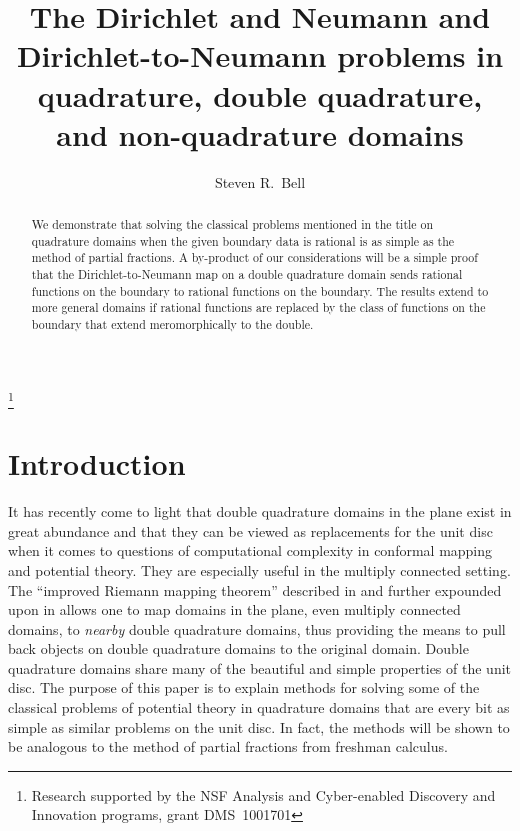 \documentclass[12pt]{amsart}
\numberwithin{equation}{section}
\begin{document}
\title[Dirichlet and Neumann
problems in quadrature domains]
{The Dirichlet and Neumann and Dirichlet-to-Neumann
problems in quadrature, double quadrature, and non-quadrature
domains}
\author[S.~R.~Bell]
{Steven R.~Bell}

\address[]{Mathematics Department, Purdue University, West Lafayette,
IN  47907}
\thanks{Research supported by the NSF Analysis and Cyber-enabled
Discovery and Innovation programs, grant DMS~1001701}



\begin{abstract}
We demonstrate that solving the classical problems mentioned
in the title on quadrature domains when the given boundary data
is rational is as simple as the method of partial fractions.  A
by-product of our considerations will be a simple proof that
the Dirichlet-to-Neumann map on a double quadrature domain sends
rational functions on the boundary to rational functions
on the boundary. The results extend to more general domains
if rational functions are replaced by the class of functions
on the boundary that extend meromorphically to the double.
\end{abstract}

\maketitle

\theoremstyle{plain}

\newtheorem {thm}{Theorem}[section]
\newtheorem {lem}[thm]{Lemma}


\section{Introduction}
\label{sec1}

It has recently come to light that double
quadrature domains in the plane exist in great
abundance and that they can be viewed as replacements
for the unit disc when it comes to questions of computational
complexity in conformal mapping and potential theory. They
are especially useful in the multiply connected setting.
The ``improved Riemann mapping theorem''
described in \cite{BGS} and further expounded
upon in \cite{B8} allows one to map domains in the
plane, even multiply connected domains, to {\it nearby\/}
double quadrature domains, thus providing the means
to pull back objects on double quadrature
domains to the original domain. Double quadrature
domains share many of the beautiful and simple
properties of the unit disc. The purpose of this
paper is to explain methods for solving some of
the classical problems of potential theory in
quadrature domains that are every bit as simple
as similar problems on the unit disc. In fact,
the methods will be shown to be analogous to
the method of partial fractions from freshman
calculus.
\end{document}
